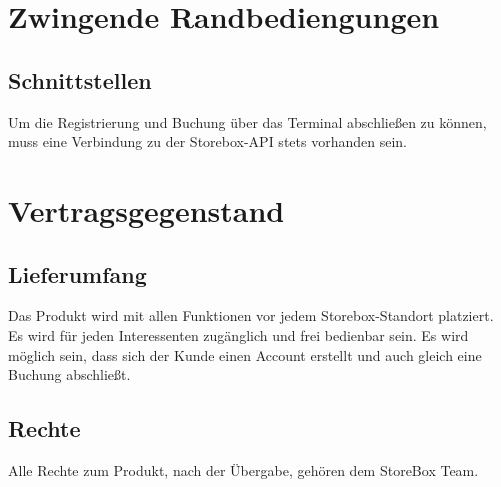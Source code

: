 
\section{Zwingende Randbediengungen}
\subsection{Schnittstellen}
Um die Registrierung und Buchung über das Terminal abschließen zu können, muss eine Verbindung zu der Storebox-API stets vorhanden sein.



\section{Vertragsgegenstand}
\subsection{Lieferumfang}
Das Produkt wird mit allen Funktionen vor jedem Storebox-Standort platziert. Es wird für jeden Interessenten zugänglich und frei bedienbar sein. Es wird möglich sein, dass sich der Kunde einen Account erstellt und auch gleich eine Buchung abschließt.

\subsection{Rechte}
Alle Rechte zum Produkt, nach der Übergabe, gehören dem StoreBox Team.